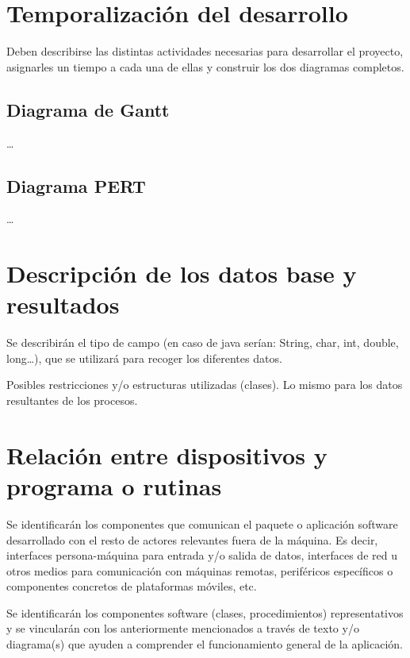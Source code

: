 \documentclass[12pt,a4paper,titlepage]{article}
\begin{document}
    \section{Temporalización del desarrollo}

    Deben describirse las distintas actividades necesarias para desarrollar el proyecto, asignarles un tiempo a cada una de ellas y construir los dos diagramas completos.

    \subsection{Diagrama de Gantt}

    \dots

    \subsection{Diagrama PERT}

    \dots

    \section{Descripción de los datos base y resultados}

    Se describirán el tipo de campo (en caso de java serían: String, char, int, double, long\dots), que se utilizará para recoger los diferentes datos.

    Posibles restricciones y/o estructuras utilizadas (clases). Lo mismo para los datos resultantes de los procesos.

    \section{Relación entre dispositivos y programa o rutinas}

    Se identificarán los componentes que comunican el paquete o aplicación software desarrollado con el resto de actores relevantes fuera de la máquina. Es decir, interfaces persona-máquina para entrada y/o salida de datos, interfaces de red u otros medios para comunicación con máquinas remotas, periféricos específicos o componentes concretos de plataformas móviles, etc.

    Se identificarán los componentes software (clases, procedimientos) representativos y se vincularán con los anteriormente mencionados a través de texto y/o diagrama(s) que ayuden a comprender el funcionamiento general de la aplicación.

    \newpage

    

    \newpage
    \printbibliography

    \newpage
    \lstlistoflistings
\end{document}
